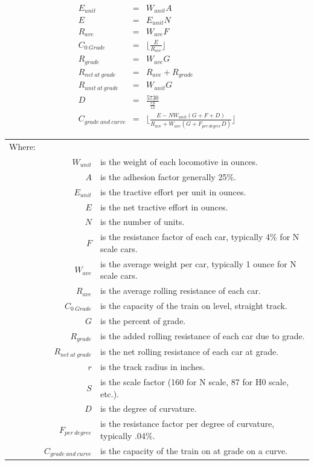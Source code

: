 \begin{eqnarray}
E_{unit} &=& W_{unit}{A} \label{eq:locopull:teperunit} \\
E  &=& E_{unit}{N} \label{eq:locopull:tenet} \\
R_{ave}  &=& W_{ave}{F} \label{eq:locopull:aveRR} \\
C_{0~Grade} &=& \Biggl\lfloor \frac{E}{R_{ave}} \Biggr\rfloor \label{eq:locopull:zgrade} \\
R_{grade}    &=& W_{ave}{G} \label{eq:locopull:rraddedgrade} \\
R_{net~at~grade} &=& R_{ave} + R_{grade} \label{eq:locopull:rratgrade} \\
R_{unit~at~grade} &=& W_{unit}{G} \label{eq:locopull:rrunitgrade} \\
D &=& \frac{5730}{\frac{rS}{12}} \label{eq:locopull:degreecurve} \\
C_{grade~and~curve} &=& \Biggl\lfloor 
     \frac{ {E} - {N} {W_{unit}} ( G + F + D ) }
          { {R_{ave}} + {W_{ave}} ( G + {F_{per~degree}}
							{D} ) } 
	\Biggr\rfloor \label{eq:locopull:capatgradecurve}
\end{eqnarray}



\begin{tabular}{rrp{3in}}
Where:&&\\
&$W_{unit}$ &is the weight of each locomotive in ounces. \\
&$A$ &is the adhesion factor generally 25\%. \\
&$E_{unit}$&is the tractive effort per unit in ounces. \\
&$E$&is the net tractive effort in ounces. \\
&$N$&is the number of units. \\
&$F$ &is the resistance factor of each car, typically 4\% for N
scale cars.\\
&$W_{ave}$&is the average weight per car, typically 1 ounce for N scale cars.\\
&$R_{ave}$&is the average rolling resistance of each car.\\
&$C_{0~Grade}$&is the capacity of the train on level, straight
track.\\
&$G$&is the percent of grade.\\
&$R_{grade}$&is the added rolling resistance of each car due to
grade.\\
&$R_{net~at~grade}$&is the net rolling resistance of each car at
grade.\\
&$r$ &is the track radius in inches.\\
&$S$&is the scale factor (160 for N scale, 87 for H0 scale, etc.).\\
&$D$& is the degree of curvature.\\
&$F_{per~degree}$&is the resistance factor per degree of curvature,
typically .04\%.\\
&$C_{grade~and~curve}$&is the capacity of the train on at grade on a
curve.\\
\end{tabular}

